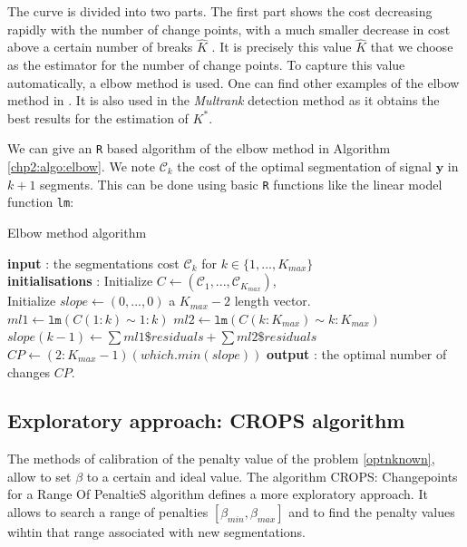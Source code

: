 The curve is divided into two parts. The first part shows the cost decreasing rapidly with the number of change points, with a much smaller decrease in cost above a certain number of breaks $\hat{K}$ \cite{LAVIELLE20051501}. It is precisely this value $\hat{K}$ that we choose as the estimator for the number of change points. To capture this value automatically, a elbow method is used. One can find other examples of the elbow method in \cite{liu2020determine,syakur2018integration}. It is also used in the \textit{Multrank} detection method \cite{lung2015} as it obtains the best results for the estimation of $K^*$.

We can give an \texttt{R} based algorithm of the elbow method in Algorithm \ref{chp2:algo:elbow}. We note $\mathcal{C}_k$ the cost of the optimal segmentation of signal $\bm y$ in $k+1$ segments. This can be done using basic \texttt{R} functions like the linear model function \texttt{lm}:   

\begin{algorithm}[ht]
\caption{Elbow method algorithm}\label{chp2:algo:elbow}
\begin{algorithmic}

\State \textbf{input} : the segmentations cost $\mathcal{C}_k$ for $k \in \{1,...,K_{max}\}$ \\

\State \textbf{initialisations} : Initialize $C \gets (\mathcal{C}_1,...,\mathcal{C}_{K_{max}})$, \\
Initialize $slope \gets (0,...,0)$  a $K_{max}-2$ length vector. 
  \State $ml1 \gets \texttt{lm}(C(1:k) \sim 1:k)$
  \State $ml2 \gets \texttt{lm}(C(k:K_{max}) \sim k:K_{max})$
  \State $slope(k-1) \gets \sum ml1\$ residuals + \sum ml2\$ residuals$
\EndFor
\State $CP \gets (2:K_{max}-1)(which.min(slope))$
\State \textbf{output} : the optimal number of changes $CP$. 
 
\end{algorithmic}
\end{algorithm} 

\subsection{Exploratory approach: CROPS algorithm}

The methods of calibration of the penalty value of the problem \ref{optnknown}, allow to set $\beta$ to a certain and ideal value. The algorithm CROPS: Changepoints for a Range Of PenaltieS algorithm defines a more exploratory approach. It allows to search a range of penalties $[\beta_{min},\beta_{max}]$ and to find the penalty values wihtin that range associated with new segmentations.  

